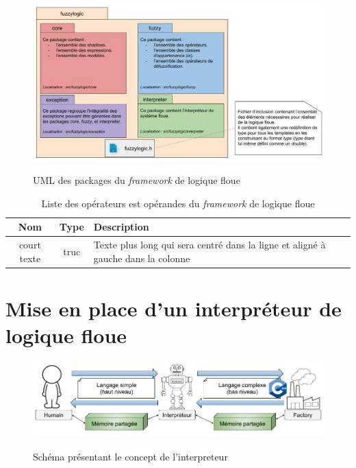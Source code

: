 \documentclass[a4paper,11pt]{article}
\begin{document}
    \begin{figure}[H]
        \begin{center}
            \caption{UML des packages du \textit{framework} de logique floue}
            \includegraphics[scale=0.51]{assets/Packages_(UML).jpg}
            \label{fig:umlPackage}
        \end{center}
    \end{figure}


    \begin{table}[H]
        \caption{Liste des opérateurs est opérandes du \textit{framework} de logique floue}
        \label{tab:listing}

        \begin{center}
            \begin{tabular}{|c|c|M{4cm}|}
                \hline
                Nom & Type & Description \tabularnewline
                \hline
                court texte & truc & Texte plus long qui sera centré dans la ligne et aligné à gauche dans la colonne  \tabularnewline
                \hline
            \end{tabular}
        \end{center}
    \end{table}
    
    \section{Mise en place d'un interpréteur de logique floue}


    \begin{figure}[h!]
        \begin{center}
            \caption{Schéma présentant le concept de l'interpreteur}
            \includegraphics[scale=0.5]{assets/Interpreteur_Dessin.jpg}
            \label{fig:interpreterDessin}
        \end{center}
    \end{figure}
\end{document}
